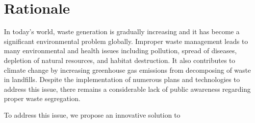 \section{Rationale}

	In today’s world, waste generation is gradually increasing and it has become a significant environmental problem globally. Improper waste management leads to many environmental and health issues including pollution, spread of diseases, depletion of natural resources, and habitat destruction. It also contributes to climate change by increasing greenhouse gas emissions from decomposing of waste in landfills. Despite the implementation of numerous plans and technologies to address this issue, there remains a considerable lack of public awareness regarding proper waste segregation.													

	To address this issue, we propose an innovative solution to 
	